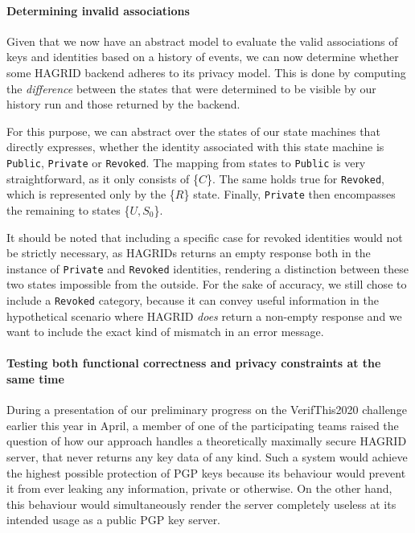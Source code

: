 \paragraph{Determining invalid associations}
Given that we now have an abstract model to evaluate the valid associations of keys and identities based on a history of events, we can now determine whether some HAGRID backend adheres to its privacy model. This is done by computing the \emph{difference} between the states that were determined to be visible by our history run and those returned by the backend.

For this purpose, we can abstract over the states of our state machines that directly expresses, whether the identity associated with this state machine is \texttt{Public}, \texttt{Private} or \texttt{Revoked}. The mapping from states to \texttt{Public} is very straightforward, as it only consists of \{\(C\)\}. The same holds true for \texttt{Revoked}, which is represented only by the \{\(R\)\} state. Finally, \texttt{Private} then encompasses the remaining to states \{\(U,S_0\)\}.

It should be noted that including a specific case for revoked identities would not be strictly necessary, as HAGRIDs returns an empty response both in the instance of \texttt{Private} and \texttt{Revoked} identities, rendering a distinction between these two states impossible from the outside. For the sake of accuracy, we still chose to include a \texttt{Revoked} category, because it can convey useful information in the hypothetical scenario where HAGRID \emph{does} return a non-empty response and we want to include the exact kind of mismatch in an error message.

\paragraph{Testing both functional correctness and privacy constraints at the same time}
During a presentation of our preliminary progress on the VerifThis2020 challenge earlier this year in April, a member of one of the participating teams raised the question of how our approach handles a theoretically maximally secure HAGRID server, that never returns any key data of any kind. Such a system would achieve the highest possible protection of PGP keys because its behaviour would prevent it from ever leaking any information, private or otherwise. On the other hand, this behaviour would simultaneously render the server completely useless at its intended usage as a public PGP key server.



